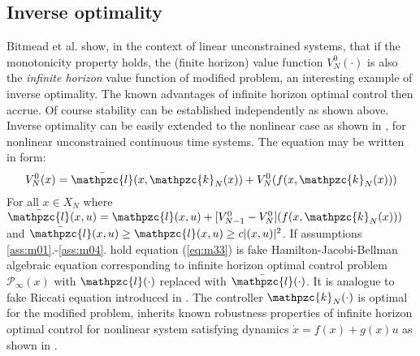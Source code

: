 \subsection*{Inverse optimality}
\noindent Bitmead et al. \cite{bitmead1990adaptive} show, in the context of linear unconstrained systems, that if the monotonicity property holds, the (finite horizon) value function $V_N^0(\cdot)$ is also the \textit{infinite horizon} value function of modified problem, an interesting example of inverse optimality. The known advantages of infinite horizon optimal control then accrue. Of course stability can be established independently as shown above. Inverse optimality can be easily extended to the nonlinear case as shown in \cite{magni1997stability}, for nonlinear unconstrained continuous time systems. The equation may be written in form:
\begin{equation}\label{eq:m33}
    V_N^0 (x) = \bar{\mathpzc{l}}(x,\mathpzc{k}_N(x))+ V_N^0(f(x,\mathpzc{k}_N(x)))
\end{equation}
\noindent For all $x\in X_N$ where $\bar{\mathpzc{l}}(x,u)=\mathpzc{l}(x,u)+[V_{N-1}^0-V_N^0](f(x,\mathpzc{k}_N(x)))$ and $\bar{\mathpzc{l}}(x,u)\ge\mathpzc{l}(x,u)\ge c|(x,u)|^2$. If assumptions \ref{ass:m01}.-\ref{ass:m04}. hold equation (\ref{eq:m33}) is fake Hamilton-Jacobi-Bellman algebraic equation corresponding to infinite horizon optimal control problem $\mathscr{P}_\infty(x)$ with $\mathpzc{l}(\cdot)$ replaced with $\bar{\mathpzc{l}}(\cdot)$. It is analogue to fake Riccati equation introduced in \cite{poubelle1988fake}. The controller $\mathpzc{k}_N(\cdot)$ is optimal for the modified problem, inherits known robustness properties of infinite horizon optimal control for nonlinear system satisfying dynamics $\dot{x}=f(x)+g(x)u$ as shown in \cite{magni1997stability}.

